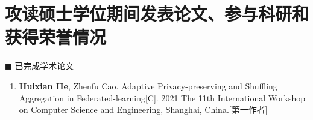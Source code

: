 \chapter*{\large 攻读硕士学位期间发表论文、参与科研和获得荣誉情况}
\vskip 2mm
\vspace{-1cm}
\renewcommand{\labelenumi}{[\arabic{enumi}]}
{\heiti $\blacksquare$ 已完成学术论文}\vskip 3mm
\begin{enumerate}
    \item \textbf{Huixian He}, Zhenfu Cao. Adaptive Privacy-preserving and Shuffling Aggregation in Federated-learning[C]. 2021 The 11th International Workshop on Computer Science and Engineering, Shanghai, China.[第一作者]

\end{enumerate}


